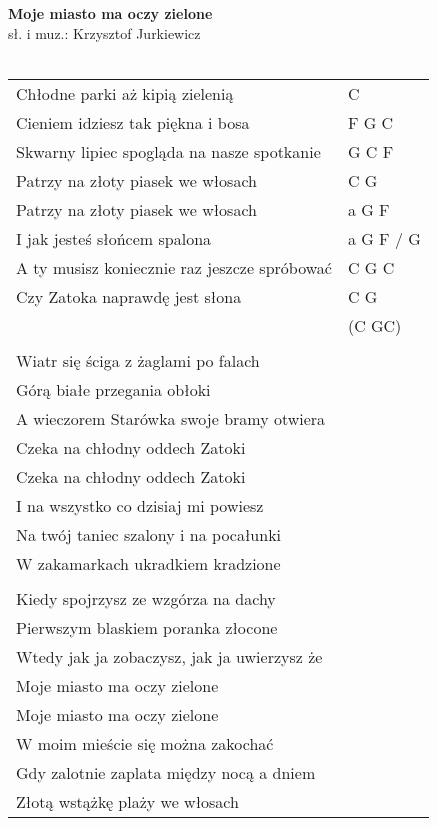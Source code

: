 \documentclass[a5paper]{article}
\begin{document}


\noindent
\fontsize{12pt}{15pt}\selectfont
\textbf{Moje miasto ma oczy zielone} \\
\fontsize{8pt}{10pt}\selectfont
sł. i muz.: Krzysztof Jurkiewicz \\ \\
\fontsize{10pt}{12pt}\selectfont
{}
\begin{tabular}{@{}p{8.50cm}p{3cm}@{}}
\noindent
Chłodne parki aż kipią zielenią & C \\
Cieniem idziesz tak piękna i bosa & F G C \\
Skwarny lipiec spogląda na nasze spotkanie & G C F \\
Patrzy na złoty piasek we włosach & C G \\
Patrzy na złoty piasek we włosach & a G F \\
I jak jesteś słońcem spalona & a G F / G \\
A ty musisz koniecznie raz jeszcze spróbować & C G C \\
Czy Zatoka naprawdę jest słona & C G \\
& (C GC) \\ \\
Wiatr się ściga z żaglami po falach \\
Górą białe przegania obłoki \\
A wieczorem Starówka swoje bramy otwiera\\
Czeka na chłodny oddech Zatoki\\
Czeka na chłodny oddech Zatoki\\
I na wszystko co dzisiaj mi powiesz\\
Na twój taniec szalony i na pocałunki\\
W zakamarkach ukradkiem kradzione\\ \\

Kiedy spojrzysz ze wzgórza na dachy\\
Pierwszym blaskiem poranka złocone\\
Wtedy jak ja zobaczysz, jak ja uwierzysz że\\
Moje miasto ma oczy zielone\\
Moje miasto ma oczy zielone\\
W moim mieście się można zakochać\\
Gdy zalotnie zaplata między nocą a dniem\\
Złotą wstążkę plaży we włosach
\end{tabular}
\end{document}
